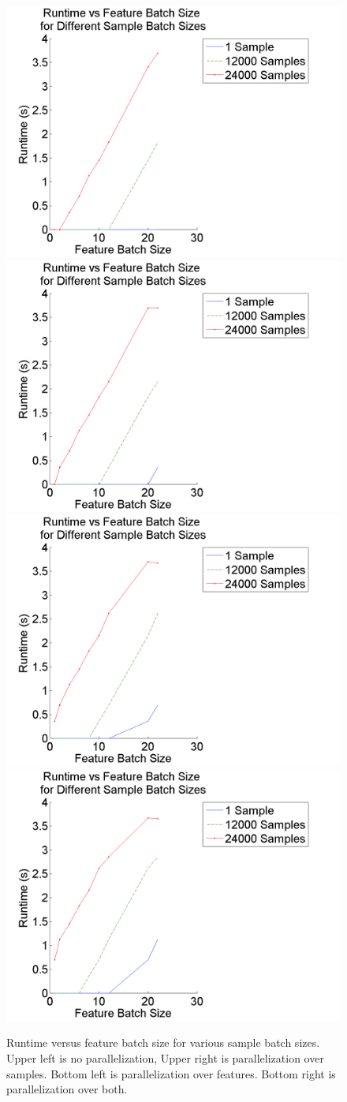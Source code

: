 \documentclass{article}
\begin{document}
\begin{figure}
\centering
\includegraphics[width = .4\linewidth]{feattimeplot5}
\includegraphics[width = .4\linewidth]{feattimeplot7}
\includegraphics[width = .4\linewidth]{feattimeplot9}
\includegraphics[width = .4\linewidth]{feattimeplot11}
\caption{Runtime versus feature batch size for various sample batch sizes. Upper left is no parallelization, Upper right is parallelization over samples. Bottom left is parallelization over features. Bottom right is parallelization over both.}
\label{fig:time_feat}
\end{figure}
\end{document}
